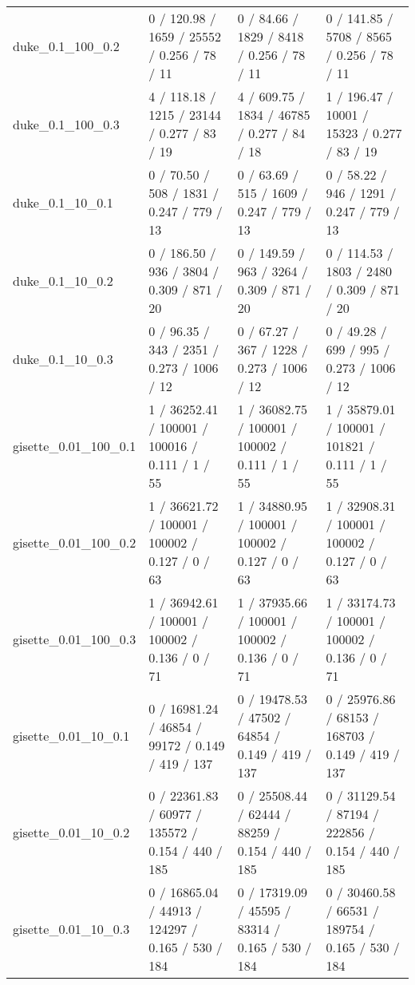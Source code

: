 \begin{tabular}{llll}
          duke\_0.1\_100\_0.2 &    0 / 120.98 /   1659 /   25552 / 0.256 /     78 /     11 &     0 / 84.66 /   1829 /    8418 / 0.256 /     78 /     11 &    0 / 141.85 /   5708 /    8565 / 0.256 /     78 /     11 \\
          duke\_0.1\_100\_0.3 &    4 / 118.18 /   1215 /   23144 / 0.277 /     83 /     19 &    4 / 609.75 /   1834 /   46785 / 0.277 /     84 /     18 &    1 / 196.47 /  10001 /   15323 / 0.277 /     83 /     19 \\
           duke\_0.1\_10\_0.1 &     0 / 70.50 /    508 /    1831 / 0.247 /    779 /     13 &     0 / 63.69 /    515 /    1609 / 0.247 /    779 /     13 &     0 / 58.22 /    946 /    1291 / 0.247 /    779 /     13 \\
           duke\_0.1\_10\_0.2 &    0 / 186.50 /    936 /    3804 / 0.309 /    871 /     20 &    0 / 149.59 /    963 /    3264 / 0.309 /    871 /     20 &    0 / 114.53 /   1803 /    2480 / 0.309 /    871 /     20 \\
           duke\_0.1\_10\_0.3 &     0 / 96.35 /    343 /    2351 / 0.273 /   1006 /     12 &     0 / 67.27 /    367 /    1228 / 0.273 /   1006 /     12 &     0 / 49.28 /    699 /     995 / 0.273 /   1006 /     12 \\
      gisette\_0.01\_100\_0.1 &  1 / 36252.41 / 100001 /  100016 / 0.111 /      1 /     55 &  1 / 36082.75 / 100001 /  100002 / 0.111 /      1 /     55 &  1 / 35879.01 / 100001 /  101821 / 0.111 /      1 /     55 \\
      gisette\_0.01\_100\_0.2 &  1 / 36621.72 / 100001 /  100002 / 0.127 /      0 /     63 &  1 / 34880.95 / 100001 /  100002 / 0.127 /      0 /     63 &  1 / 32908.31 / 100001 /  100002 / 0.127 /      0 /     63 \\
      gisette\_0.01\_100\_0.3 &  1 / 36942.61 / 100001 /  100002 / 0.136 /      0 /     71 &  1 / 37935.66 / 100001 /  100002 / 0.136 /      0 /     71 &  1 / 33174.73 / 100001 /  100002 / 0.136 /      0 /     71 \\
       gisette\_0.01\_10\_0.1 &  0 / 16981.24 /  46854 /   99172 / 0.149 /    419 /    137 &  0 / 19478.53 /  47502 /   64854 / 0.149 /    419 /    137 &  0 / 25976.86 /  68153 /  168703 / 0.149 /    419 /    137 \\
       gisette\_0.01\_10\_0.2 &  0 / 22361.83 /  60977 /  135572 / 0.154 /    440 /    185 &  0 / 25508.44 /  62444 /   88259 / 0.154 /    440 /    185 &  0 / 31129.54 /  87194 /  222856 / 0.154 /    440 /    185 \\
       gisette\_0.01\_10\_0.3 &  0 / 16865.04 /  44913 /  124297 / 0.165 /    530 /    184 &  0 / 17319.09 /  45595 /   83314 / 0.165 /    530 /    184 &  0 / 30460.58 /  66531 /  189754 / 0.165 /    530 /    184 \\

\end{tabular}

